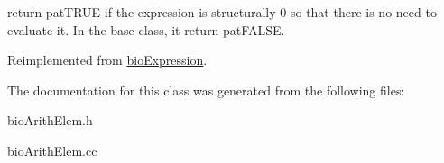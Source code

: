 return pat\+T\+R\+UE if the expression is structurally 0 so that there is no need to evaluate it. In the base class, it return pat\+F\+A\+L\+SE. 

Reimplemented from \hyperlink{classbio_expression_a264c6d78671610ada8261d698e4c4c42}{bio\+Expression}.



The documentation for this class was generated from the following files\+:\begin{DoxyCompactItemize}
\item 
bio\+Arith\+Elem.\+h\item 
bio\+Arith\+Elem.\+cc\end{DoxyCompactItemize}
